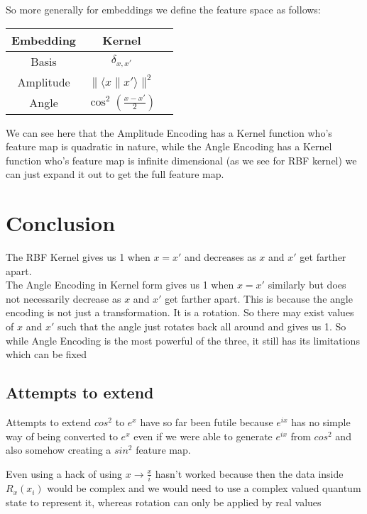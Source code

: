 \documentclass[hidelinks]{book}
\numberwithin{equation}{section}
\begin{document}
So more generally for embeddings we define the feature space as follows:
\begin{center}
\begin{tabular}{ |c|c|c| }
  \hline
  Embedding & Kernel \\
  \hline
  Basis & $\delta_{x,x'}$ \\
  Amplitude & $\|\langle x\|x'\rangle\|^2$ \\
  Angle & $\cos^2(\frac{x-x'}{2})$ \\
  \hline
\end{tabular}
\end{center}

We can see here that the Amplitude Encoding has a Kernel function who's feature map is quadratic in nature,
while the Angle Encoding has a Kernel function who's feature map is infinite dimensional (as we see for RBF kernel)
we can just expand it out to get the full feature map.\\

\section{Conclusion}
The RBF Kernel gives us 1 when $x = x'$ and decreases as $x$ and $x'$ get farther apart. \\

The Angle Encoding in Kernel form gives us 1 when $x = x'$ similarly but does not necessarily
decrease as $x$ and $x'$ get farther apart. This is because the angle encoding is not just a
transformation. It is a rotation. So there may exist values of $x$ and $x'$ such that the angle
just rotates back all around and gives us 1. So while Angle Encoding is the most powerful of the
three, it still has its limitations which can be fixed

\subsection{Attempts to extend}
Attempts to extend $cos^2$ to $e^x$ have so far been futile because $e^{ix}$ has no simple way
of being converted to $e^x$ even if we were able to generate $e^{ix}$ from $cos^2$ and also somehow
creating a $sin^2$ feature map.

Even using a hack of using $x \rightarrow \frac{x}{i}$ hasn't worked because then the data inside $R_x(x_i)$
would be complex and we would need to use a complex valued quantum state to represent it, whereas rotation can
only be applied by real values
\end{document}
